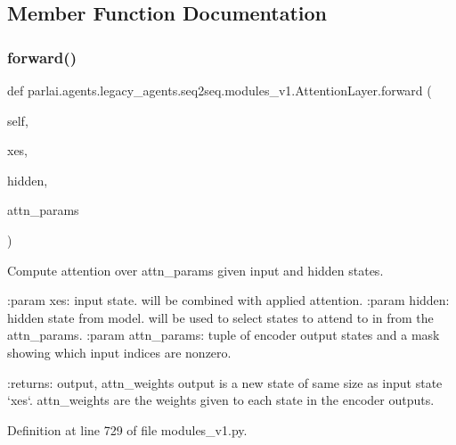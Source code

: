\subsection{Member Function Documentation}
\mbox{\label{classparlai_1_1agents_1_1legacy__agents_1_1seq2seq_1_1modules__v1_1_1AttentionLayer_ad6041bd52e148a4dfe894b71f79937c0}} 
\subsubsection{\texorpdfstring{forward()}{forward()}}
{\footnotesize\ttfamily def parlai.\+agents.\+legacy\+\_\+agents.\+seq2seq.\+modules\+\_\+v1.\+Attention\+Layer.\+forward (\begin{DoxyParamCaption}\item[{}]{self,  }\item[{}]{xes,  }\item[{}]{hidden,  }\item[{}]{attn\+\_\+params }\end{DoxyParamCaption})}

\begin{DoxyVerb}Compute attention over attn_params given input and hidden states.

:param xes:         input state. will be combined with applied
            attention.
:param hidden:      hidden state from model. will be used to select
            states to attend to in from the attn_params.
:param attn_params: tuple of encoder output states and a mask showing
            which input indices are nonzero.

:returns: output, attn_weights
  output is a new state of same size as input state `xes`.
  attn_weights are the weights given to each state in the
  encoder outputs.
\end{DoxyVerb}
 

Definition at line 729 of file modules\+\_\+v1.\+py.



